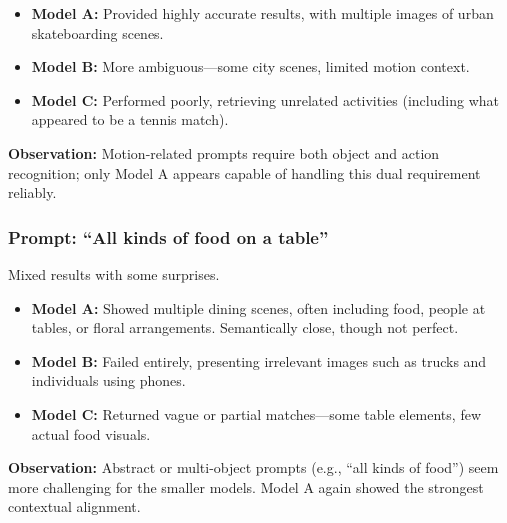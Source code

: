 \documentclass[11pt]{article}
\begin{document}
\begin{itemize}
    \item \textbf{Model A:} Provided highly accurate results, with multiple images of urban skateboarding scenes.
    \item \textbf{Model B:} More ambiguous—some city scenes, limited motion context.
    \item \textbf{Model C:} Performed poorly, retrieving unrelated activities (including what appeared to be a tennis match).
\end{itemize}

\textbf{Observation:} Motion-related prompts require both object and action recognition; only Model A appears capable of handling this dual requirement reliably.

\subsubsection{Prompt: ``All kinds of food on a table''}
Mixed results with some surprises.

\begin{itemize}
    \item \textbf{Model A:} Showed multiple dining scenes, often including food, people at tables, or floral arrangements. Semantically close, though not perfect.
    \item \textbf{Model B:} Failed entirely, presenting irrelevant images such as trucks and individuals using phones.
    \item \textbf{Model C:} Returned vague or partial matches—some table elements, few actual food visuals.
\end{itemize}

\textbf{Observation:} Abstract or multi-object prompts (e.g., “all kinds of food”) seem more challenging for the smaller models. Model A again showed the strongest contextual alignment.
\end{document}
